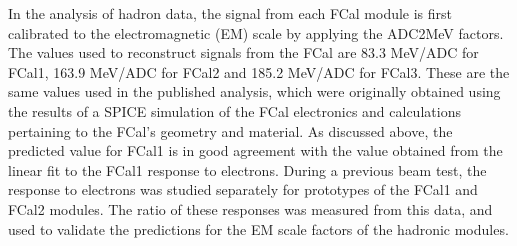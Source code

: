 In the analysis of hadron data, the signal from each FCal module is first calibrated to the electromagnetic (EM) scale by applying the ADC2MeV factors.
The values used to reconstruct signals from the FCal are 83.3 MeV/ADC for FCal1, 163.9 MeV/ADC for FCal2 and 185.2 MeV/ADC for  FCal3. These are the same values used in the published analysis\cite{Fcalpaper}, which were originally obtained using the results of a SPICE simulation of the FCal electronics and calculations pertaining to the FCal's geometry and material. As discussed above, the predicted value for FCal1 is in good agreement with the value obtained from the linear fit to the FCal1 response to electrons. During a previous beam test\cite{TB98_electron_signals}, the response to electrons was studied separately for prototypes of the FCal1 and FCal2 modules. The ratio of these responses was measured from this data, and used to validate the predictions for the EM scale factors of the hadronic modules.

%


